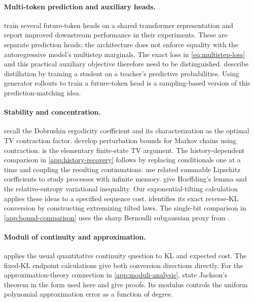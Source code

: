 \documentclass[11pt,twoside]{article}
\theoremstyle{definition}
\theoremstyle{remark}
\begin{document}
\paragraph{Multi-token prediction and auxiliary heads.}
\label{note:multistep-heads}
\citet[Section~2]{gloeckle2024} train several future-token heads on a
shared transformer representation and report improved downstream
performance in their experiments. These are separate prediction heads;
the architecture does not enforce equality with the autoregressive
model's multistep marginals. The exact loss in \cref{eq:multistep-loss}
and this practical auxiliary objective therefore need to be distinguished.
\citet[Section~2]{hinton2015} describe distillation by training a student
on a teacher's predictive probabilities. Using generator rollouts to
train a future-token head is a sampling-based version of this
prediction-matching idea.

\paragraph{Stability and concentration.}
\citet[Section~1]{gaubert2015} recall the Dobrushin ergodicity coefficient
and its characterization as the optimal TV contraction factor.
\citet{rudolf2018} develop perturbation bounds for Markov chains using
contraction.  is the elementary finite-state
TV argument. The history-dependent comparison in
\cref{app:history-recovery} follows by replacing conditionals one
at a time and coupling the resulting continuations.
\citet[Section~3.1]{doukhan2007} use related summable Lipschitz
coefficients to study processes with infinite memory.
\citet[Sections~2.2.1 and~3.4.3]{raginsky2014} give
Hoeffding's lemma and the relative-entropy variational inequality.
Our exponential-tilting calculation applies these ideas to a specified
sequence cost.  identifies its exact
reverse-KL conversion by constructing extremizing tilted laws.
The single-bit comparison in \cref{app:bound-comparison} uses the
sharp Bernoulli subgaussian proxy from \citet{schlemm2014}.

\paragraph{Moduli of continuity and approximation.}
 applies the usual quantitative
continuity question to KL and expected cost. The fixed-KL endpoint
calculations give both conversion directions directly.
For the approximation-theory connection in \cref{app:moduli-analysis},
\citet[Theorem~1]{drucker2011} state Jackson's theorem in the form used
here and give proofs. Its modulus controls the uniform polynomial
approximation error as a function of degree.
\end{document}
